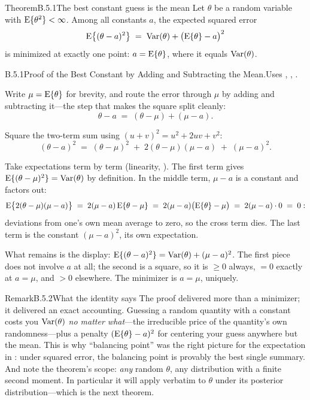 \documentclass[main.tex]{subfiles}
\begin{document}
\begin{Obj}{Theorem}{B.5.1}{The best constant guess is the mean}
Let $\theta$ be a random variable with $\mathrm{E}\{\theta^2\}<\infty$. Among all constants $a$,
the expected squared error
\[ \mathrm{E}\big\{ (\theta - a)^2 \big\} \;=\; \operatorname{Var}(\theta) + \big( \mathrm{E}\{\theta\} - a \big)^2 \]
is minimized at exactly one point: $a = \mathrm{E}\{\theta\}$, where it equals $\operatorname{Var}(\theta)$.
\end{Obj}
\begin{Prf}{B.5.1}{Proof of the Best Constant by Adding and Subtracting the Mean.}{Uses , , .}
\item Write $\mu=\mathrm{E}\{\theta\}$ for brevity, and route the error through $\mu$ by adding and
      subtracting it---the step that makes the square split cleanly:
      \[ \theta - a \;=\; (\theta - \mu) + (\mu - a) . \]
\item Square the two-term sum using $(u+v)^2=u^2+2uv+v^2$:
      \[ (\theta-a)^2 \;=\; (\theta-\mu)^2 \;+\; 2(\theta-\mu)(\mu-a) \;+\; (\mu-a)^2 . \]
\item Take expectations term by term (linearity, ). The first term gives
      $\mathrm{E}\{(\theta-\mu)^2\}=\operatorname{Var}(\theta)$ by definition. In the middle term, $\mu-a$ is a
      constant and factors out:
      \[ \mathrm{E}\big\{2(\theta-\mu)(\mu-a)\big\} \;=\; 2(\mu-a)\,\mathrm{E}\{\theta-\mu\}
         \;=\; 2(\mu-a)\big(\mathrm{E}\{\theta\}-\mu\big) \;=\; 2(\mu-a)\cdot 0 \;=\; 0 : \]
      deviations from one's own mean average to zero, so the cross term dies. The last term
      is the constant $(\mu-a)^2$, its own expectation.
\item What remains is the display:
      $\mathrm{E}\{(\theta-a)^2\} = \operatorname{Var}(\theta) + (\mu-a)^2$. The first piece does not involve
      $a$ at all; the second is a square, so it is $\ge 0$ always, $=0$ exactly at
      $a=\mu$, and $>0$ elsewhere. The minimizer is $a=\mu$, uniquely.
\end{Prf}

\begin{ObjL}{Remark}{B.5.2}{What the identity says}
The proof delivered more than a minimizer; it delivered an exact accounting. Guessing a
random quantity with a constant costs you $\operatorname{Var}(\theta)$ \emph{no matter what}---the
irreducible price of the quantity's own randomness---plus a penalty $(\mathrm{E}\{\theta\}-a)^2$
for centering your guess anywhere but the mean. This is why ``balancing point'' was the
right picture for the expectation in : under squared error, the balancing point
is provably the best single summary. And note the theorem's scope: \emph{any} random
$\theta$, any distribution with a finite second moment. In particular it will apply
verbatim to $\theta$ under its posterior distribution---which is the next theorem.
\end{ObjL}
\end{document}
